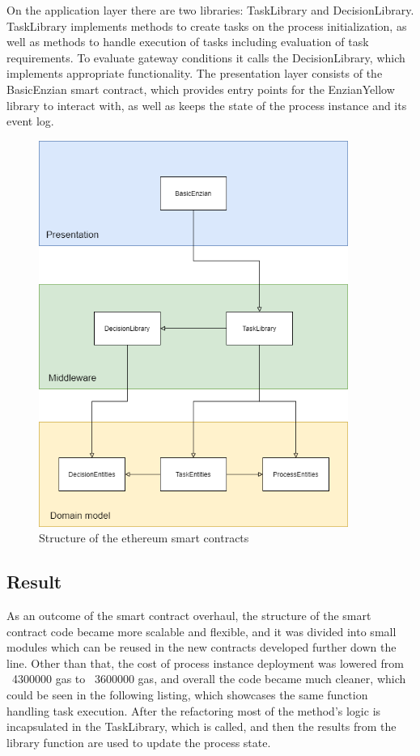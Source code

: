 On the application layer there are two libraries: TaskLibrary and DecisionLibrary. TaskLibrary implements methods to create tasks on the process initialization, as well as methods to handle execution of tasks including evaluation of task requirements. To evaluate gateway conditions it calls the DecisionLibrary, which implements appropriate functionality.\newline
The presentation layer consists of the BasicEnzian smart contract, which provides entry points for the EnzianYellow library to interact with, as well as keeps the state of the process instance and its event log. 

\begin{figure}[h]
	\includegraphics[width=0.9\textwidth]{gfx/eth-contracts}
	\caption{Structure of the ethereum smart contracts}
	\label{fig:impr:eth:contracts}
\end{figure}

\subsection{Result}
\label{sec:impr:eth:result}

As an outcome of the smart contract overhaul, the structure of the smart contract code became more scalable and flexible, and it was divided into small modules which can be reused in the new contracts developed further down the line.
Other than that, the cost of process instance deployment was lowered from ~4300000 gas to ~3600000 gas, and overall the code became much cleaner, which could be seen in the following listing, which showcases the same function handling task execution. After the refactoring most of the method's logic is incapsulated in the TaskLibrary, which is called, and then the results from the library function are used to update the process state.

 

